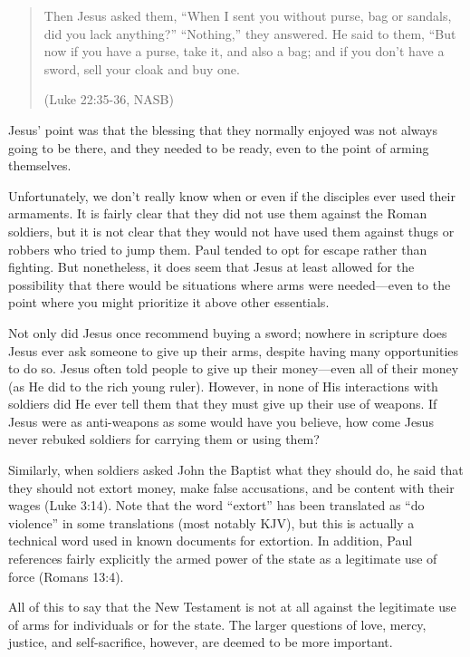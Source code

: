 \begin{quote}
Then Jesus asked them, “When I sent you without purse, bag or sandals,
did you lack anything?”  “Nothing,” they answered.  He said to them,
“But now if you have a purse, take it, and also a bag; and if you don’t
have a sword, sell your cloak and buy one.  

(Luke 22:35-36, NASB)
\end{quote}

Jesus’ point was that the blessing that they normally enjoyed was not
always going to be there, and they needed to be ready, even to the
point of arming themselves.

Unfortunately, we don’t really know when or even if the disciples ever
used their armaments. It is fairly clear that they did not use them
against the Roman soldiers, but it is not clear that they would not
have used them against thugs or robbers who tried to jump them. Paul
tended to opt for escape rather than fighting. But nonetheless, it does
seem that Jesus at least allowed for the possibility that there would
be situations where arms were needed—even to the point where you might
prioritize it above other essentials.

Not only did Jesus once recommend buying a sword; nowhere in scripture
does Jesus ever ask someone to give up their arms, despite having many
opportunities to do so. Jesus often told people to give up their
money—even all of their money (as He did to the rich young ruler).
However, in none of His interactions with soldiers did He ever tell
them that they must give up their use of weapons. If Jesus were as
anti-weapons as some would have you believe, how come Jesus never
rebuked soldiers for carrying them or using them?

Similarly, when soldiers asked John the Baptist what they should do, he
said that they should not extort money, make false accusations, and be
content with their wages (Luke 3:14). Note that the word “extort” has
been translated as “do violence” in some translations (most notably
KJV), but this is actually a technical word used in known documents for
extortion. In addition, Paul references fairly explicitly the armed
power of the state as a legitimate use of force (Romans 13:4). 

All of this to say that the New Testament is not at all against the
legitimate use of arms for individuals or for the state. The larger
questions of love, mercy, justice, and self-sacrifice, however, are
deemed to be more important.

